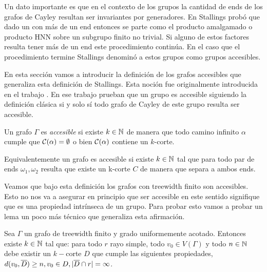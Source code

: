 \documentclass[tesis.tex]{subfiles}
\begin{document}
Un dato importante es que en el contexto de los grupos la cantidad de ends de los grafos de Cayley resultan ser invariantes por generadores.
En \cite{stallings1971group} Stallings probó que dado un \fg con más de un end entonces se parte como el producto amalgamado o producto HNN sobre un subgrupo finito no trivial.
Si alguno de estos factores resulta tener más de un end este procedimiento continúa.
En el caso que el procedimiento termine Stallings denominó a estos grupos como grupos accesibles. 

En esta sección vamos a introducir la definición de los grafos accesibles que generaliza esta definición de Stallings.
Esta noción fue originalmente introducida en el trabajo \cite{thomassen1993vertex}.
En ese trabajo prueban que un grupo es accesible siguiendo la definición clásica si y solo sí todo grafo de Cayley de este grupo resulta ser accesible.
\begin{deff}
	Un grafo $\Gamma$ es \emph{accesible} si existe $k \in \mathbb{N}$ de manera que todo camino infinito $\alpha$ cumple que ${\cal C}(\alpha) = \emptyset$ o bien ${\cal C}(\alpha)$ contiene un $k$-corte.
\end{deff}
Equivalentemente un grafo es accesible si existe $k \in \mathbb{N}$ tal que para todo par de ends $\omega_1, \omega_2$ resulta que existe un k-corte $C$ de manera que separa a ambos ends.


Veamos que bajo esta definición los grafos con treewidth finito son accesibles.
Esto no nos va a asegurar en principio que ser accesible en este sentido signifique que es una propiedad intrínseca de un grupo.
Para probar esto vamos a probar un lema un poco más técnico que generaliza esta afirmación.

\begin{lema}\label{lema_corte_treewidth}
	Sea $\Gamma$ un grafo de treewidth finito y grado uniformemente acotado.
	Entonces existe $k \in \mathbb{N}$ tal que:
	para todo $r$ rayo simple, todo $v_0 \in V(\Gamma)$ y todo $n \in \mathbb{N}$ debe existir un $k-$corte $D$ que cumple las siguientes propiedades, $d(v_0,\overline D) \ge n, v_0 \in D, |\overline D \cap r| = \infty$. 
\end{lema}
\end{document}
